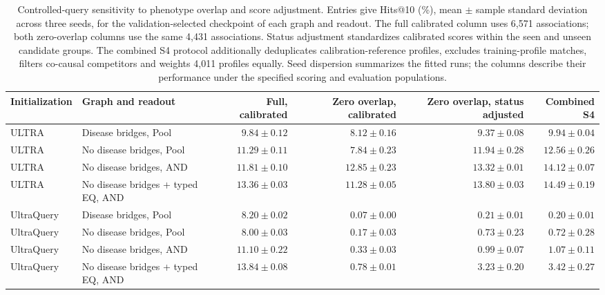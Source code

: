 \begin{table}[tb]
\centering\small
\caption{Controlled-query sensitivity to phenotype overlap and score adjustment. Entries give Hits@10 (\%), mean $\pm$ sample standard deviation across three seeds, for the validation-selected checkpoint of each graph and readout. The full calibrated column uses 6,571 associations; both zero-overlap columns use the same 4,431 associations. Status adjustment standardizes calibrated scores within the seen and unseen candidate groups. The combined S4 protocol additionally deduplicates calibration-reference profiles, excludes training-profile matches, filters co-causal competitors and weights 4,011 profiles equally. Seed dispersion summarizes the fitted runs; the columns describe their performance under the specified scoring and evaluation populations.}
\label{tab:controlled_bias_summary}
\begin{adjustbox}{max width=\linewidth}
\begin{tabular}{llrrrr}
\toprule
Initialization & Graph and readout & Full, calibrated & Zero overlap, calibrated & Zero overlap, status adjusted & Combined S4 \\
\midrule
ULTRA & Disease bridges, Pool & $9.84\pm 0.12$ & $8.12\pm 0.16$ & $9.37\pm 0.08$ & $9.94\pm 0.04$ \\
ULTRA & No disease bridges, Pool & $11.29\pm 0.11$ & $7.84\pm 0.23$ & $11.94\pm 0.28$ & $12.56\pm 0.26$ \\
ULTRA & No disease bridges, AND & $11.81\pm 0.10$ & $12.85\pm 0.23$ & $13.32\pm 0.01$ & $14.12\pm 0.07$ \\
ULTRA & No disease bridges + typed EQ, AND & $13.36\pm 0.03$ & $11.28\pm 0.05$ & $13.80\pm 0.03$ & $14.49\pm 0.19$ \\
UltraQuery & Disease bridges, Pool & $8.20\pm 0.02$ & $0.07\pm 0.00$ & $0.21\pm 0.01$ & $0.20\pm 0.01$ \\
UltraQuery & No disease bridges, Pool & $8.00\pm 0.03$ & $0.17\pm 0.03$ & $0.73\pm 0.23$ & $0.72\pm 0.28$ \\
UltraQuery & No disease bridges, AND & $11.10\pm 0.22$ & $0.33\pm 0.03$ & $0.99\pm 0.07$ & $1.07\pm 0.11$ \\
UltraQuery & No disease bridges + typed EQ, AND & $13.84\pm 0.08$ & $0.78\pm 0.01$ & $3.23\pm 0.20$ & $3.42\pm 0.27$ \\
\bottomrule
\end{tabular}
\end{adjustbox}
\end{table}
